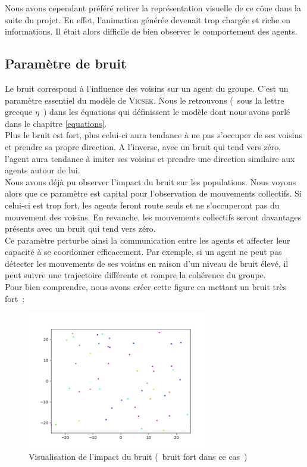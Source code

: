 \documentclass[french, a4paper, 12pt, openany]{report}
\begin{document}
	Nous avons cependant préféré retirer la représentation visuelle de ce cône dans la suite du projet. En effet, l'animation générée devenait trop chargée et riche en informations. Il était alors difficile de bien observer le comportement des agents.\\  
  
  \subsection{Paramètre de bruit}
    
   Le bruit correspond à l'influence des voisins sur un agent du groupe. C'est un paramètre essentiel du modèle de \textsc{Vicsek}. Nous le retrouvons (~sous la lettre grecque $\eta$~)  dans les équations qui définissent le modèle dont nous avons parlé dans le chapitre \ref{equations}.\\
   
   Plus le bruit est fort, plus celui-ci aura tendance à ne pas s'occuper de ses voisins et prendre sa propre direction. A l'inverse, avec un bruit qui tend vers zéro, l'agent aura tendance à imiter ses voisins et prendre une direction similaire aux agents autour de lui. \\
    
   Nous avons déjà pu observer l'impact du bruit sur les populations. Nous voyons alors que ce paramètre est capital pour l'observation de mouvements collectifs. Si celui-ci est trop fort, les agents feront route seuls et ne s'occuperont pas du mouvement des voisins. En revanche, les mouvements collectifs seront davantages présents avec un bruit qui tend vers zéro.\\

   Ce paramètre perturbe ainsi la communication entre les agents et affecter leur capacité à se coordonner efficacement. Par exemple, si un agent ne peut pas détecter les mouvements de ses voisins en raison d'un niveau de bruit élevé, il peut suivre une trajectoire différente et rompre la cohérence du groupe.\\

\newpage
Pour bien comprendre, nous avons créer cette figure en mettant un bruit très fort~:


   \begin{figure}[!h]
		\centering
		\includegraphics[width=8cm]{images/image_10.png}
		\caption{Visualisation de l'impact du bruit (~bruit fort dans ce cas~)}
		\label{bruit}
	\end{figure}  
\end{document}
